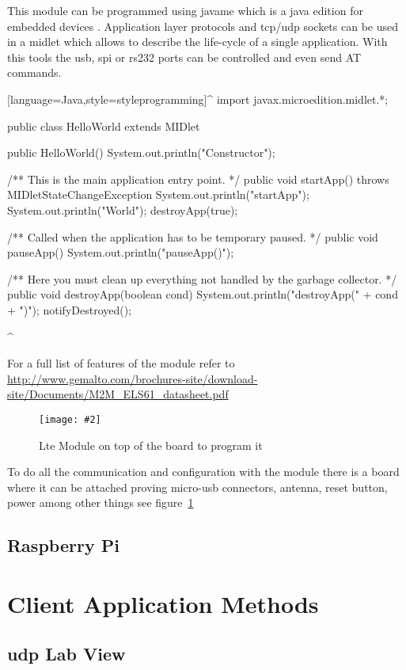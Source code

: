 \documentclass[hidelinks,11pt,a4paper,oneside,article]{memoir}
\newcommand{\putimage}[3][10] %
{
\begin{figure}[h]
	\centering
	\captionsetup{justification=centering}
	\texttt{[image: \#2]}
	\caption{#3}
	\label{fig:#2}
\end{figure}
}
\begin{document}
This module can be programmed using \gls{javame} which is a \gls{java} edition for embedded devices \cite{javame}. Application layer protocols and \gls{tcp}/\gls{udp} sockets can be used in a \gls{midlet} which allows to describe the life-cycle of a single application. With this tools the \gls{usb}, \gls{spi} or \gls{rs232} ports can be controlled and even send AT commands.


[language=Java,style=styleprogramming]^
import javax.microedition.midlet.*;

public class HelloWorld extends MIDlet {
    
    public HelloWorld() {
        System.out.println("Constructor");
    }
    
    /** This is the main application entry point. */
    public void startApp() throws MIDletStateChangeException {
        System.out.println("startApp");
        System.out.println("\nHello World\n");
        destroyApp(true);
    }
    
    /**  Called when the application has to be temporary paused. */
    public void pauseApp() {
        System.out.println("pauseApp()");
    }
    
    /** Here you must clean up everything not handled by the garbage collector. */
    public void destroyApp(boolean cond) {
        System.out.println("destroyApp(" + cond + ")");
        notifyDestroyed();
    }
}
^ %


For a full list of features of the module refer to \url{http://www.gemalto.com/brochures-site/download-site/Documents/M2M_ELS61_datasheet.pdf}


	\putimage{lte_board}{Lte Module on top of the board to program it}
To do all the communication and configuration with the module there is a board where it can be attached proving micro-usb connectors, antenna, reset button, power among other things see figure~\ref{fig:lte_board}





\subsection{Raspberry Pi}


\section{Client Application Methods}
\subsection{\gls{udp} Lab View}
\end{document}
